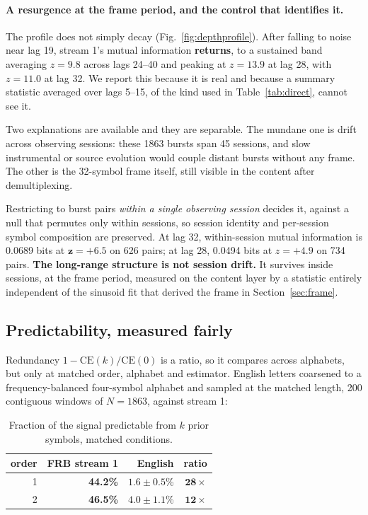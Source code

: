 \documentclass[11pt,a4paper]{article}
\newcommand{\bnum}[1]{\textbf{#1}}
\begin{document}
\paragraph{A resurgence at the frame period, and the control that identifies it.} The
profile does not simply decay (Fig.~\ref{fig:depthprofile}). After falling to noise
near lag 19, stream 1's mutual
information \textbf{returns}, to a sustained band averaging $z = 9.8$ across lags 24--40
and peaking at $z = 13.9$ at lag 28, with $z = 11.0$ at lag 32. We report this because it
is real and because a summary statistic averaged over lags 5--15, of the kind used in
Table~\ref{tab:direct}, cannot see it.

Two explanations are available and they are separable. The mundane one is drift across
observing sessions: these 1863 bursts span 45 sessions, and slow instrumental or source
evolution would couple distant bursts without any frame. The other is the 32-symbol frame
itself, still visible in the content after demultiplexing.

Restricting to burst pairs \emph{within a single observing session} decides it, against
a null that permutes only within sessions, so session identity and per-session symbol
composition are preserved. At lag 32, within-session mutual information is 0.0689 bits
at $\mathbf{z = +6.5}$ on 626 pairs; at lag 28, 0.0494 bits at $z = +4.9$ on 734 pairs.
\textbf{The long-range structure is not session drift.} It survives inside sessions, at
the frame period, measured on the content layer by a statistic entirely independent of
the sinusoid fit that derived the frame in Section~\ref{sec:frame}.

\subsection{Predictability, measured fairly}

Redundancy $1 - \mathrm{CE}(k)/\mathrm{CE}(0)$ is a ratio, so it compares across
alphabets, but only at matched order, alphabet and estimator. English letters coarsened
to a frequency-balanced four-symbol alphabet and sampled at the matched length, 200
contiguous windows of $N = 1863$, against stream 1:

\begin{table}[htbp]
\centering
\caption{Fraction of the signal predictable from $k$ prior symbols, matched conditions.}
\label{tab:redundancy}
\begin{tabular}{rrrr}
\toprule
order & FRB stream 1 & English & ratio \\
\midrule
1 & \bnum{44.2\%} & $1.6 \pm 0.5$\% & $\mathbf{28\times}$ \\
2 & \bnum{46.5\%} & $4.0 \pm 1.1$\% & $\mathbf{12\times}$ \\
\bottomrule
\end{tabular}
\end{table}
\end{document}
